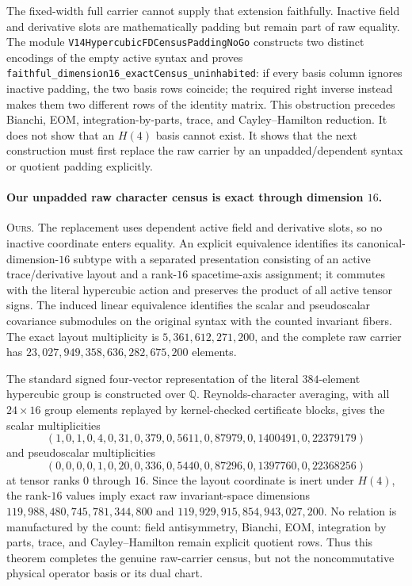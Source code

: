 \documentclass[11pt]{article}
\theoremstyle{definition}
\begin{document}
The fixed-width full carrier cannot supply that extension faithfully.
Inactive field and derivative slots are mathematically padding but remain
part of raw equality. The module
\texttt{V14HypercubicFDCensusPaddingNoGo} constructs two distinct encodings
of the empty active syntax and proves
\texttt{faithful\_dimension16\_exactCensus\_uninhabited}: if every basis
column ignores inactive padding, the two basis rows coincide; the required
right inverse instead makes them two different rows of the identity matrix.
This obstruction precedes Bianchi, EOM, integration-by-parts, trace, and
Cayley--Hamilton reduction. It does not show that an $H(4)$ basis cannot
exist. It shows that the next construction must first replace the raw carrier
by an unpadded/dependent syntax or quotient padding explicitly.

\paragraph{Our unpadded raw character census is exact through dimension
$16$.}
\textsc{Ours.} The replacement uses dependent active field and derivative
slots, so no inactive coordinate enters equality. An explicit equivalence
identifies its canonical-dimension-$16$ subtype with a separated presentation
consisting of an active trace/derivative layout and a rank-$16$ spacetime-axis
assignment; it commutes with the literal hypercubic action and preserves the
product of all active tensor signs. The induced linear equivalence identifies
the scalar and pseudoscalar covariance submodules on the original syntax with
the counted invariant fibers. The exact layout multiplicity is
$5{,}361{,}612{,}271{,}200$, and the complete raw carrier has
$23{,}027{,}949{,}358{,}636{,}282{,}675{,}200$ elements.

The standard signed four-vector representation of the literal $384$-element
hypercubic group is constructed over $\mathbb{Q}$. Reynolds-character
averaging, with all $24\times16$ group elements replayed by kernel-checked
certificate blocks, gives the scalar multiplicities
\[
 (1,0,1,0,4,0,31,0,379,0,5611,0,87979,0,
   1400491,0,22379179)
\]
and pseudoscalar multiplicities
\[
 (0,0,0,0,1,0,20,0,336,0,5440,0,87296,0,
   1397760,0,22368256)
\]
at tensor ranks $0$ through $16$. Since the layout coordinate is inert under
$H(4)$, the rank-$16$ values imply exact raw invariant-space dimensions
$119{,}988{,}480{,}745{,}781{,}344{,}800$ and
$119{,}929{,}915{,}854{,}943{,}027{,}200$. No relation is manufactured by
the count: field antisymmetry, Bianchi, EOM, integration by parts, trace, and
Cayley--Hamilton remain explicit quotient rows. Thus this theorem completes
the genuine raw-carrier census, but not the noncommutative physical operator
basis or its dual chart.
\end{document}
